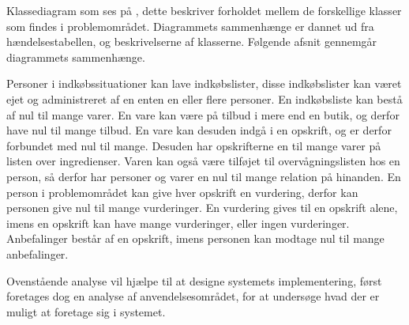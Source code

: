 Klassediagram som ses på , dette beskriver forholdet mellem de forskellige klasser som findes i problemområdet.
Diagrammets sammenhænge er dannet ud fra hændelsestabellen, og beskrivelserne af klasserne.
Følgende afsnit gennemgår diagrammets sammenhænge.

Personer i indkøbssituationer kan lave indkøbslister, disse indkøbslister kan været ejet og administreret af en enten en eller flere personer.
En indkøbsliste kan bestå af nul til mange varer.
En vare kan være på tilbud i mere end en butik, og derfor have nul til mange tilbud.
En vare kan desuden indgå i en opskrift, og er derfor forbundet med nul til mange.
Desuden har opskrifterne en til mange varer på listen over ingredienser.
Varen kan også være tilføjet til overvågningslisten hos en person, så derfor har personer og varer en nul til mange relation på hinanden.
En person i problemområdet kan give hver opskrift en vurdering, derfor kan personen give nul til mange vurderinger.
En vurdering gives til en opskrift alene, imens en opskrift kan have mange vurderinger, eller ingen vurderinger.
Anbefalinger består af en opskrift, imens personen kan modtage nul til mange anbefalinger.

Ovenstående analyse vil hjælpe til at designe systemets implementering, først foretages dog en analyse af anvendelsesområdet, for at undersøge hvad der er muligt at foretage sig i systemet.
